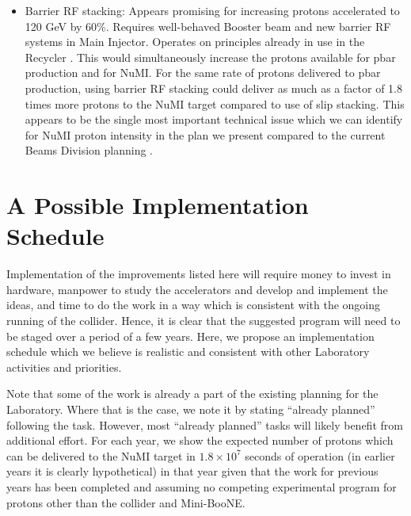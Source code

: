 \documentclass{article}
\begin{document}
\begin {itemize}
         difficulties in multi-batch operation. However, should a single
         batch be slip-stacked for the collider this will reduce the protons
         available to NuMI by about 10\%.
   \item Barrier RF stacking: Appears promising for increasing protons
         accelerated to 120 GeV by 60\%. Requires well-behaved Booster
         beam and new barrier RF systems in Main Injector. Operates on
         principles already in use in the Recycler \cite {Recycler}. This
         would simultaneously increase the protons available for pbar 
         production and for NuMI. For the same rate of protons delivered
         to pbar production, using barrier RF stacking could deliver as
         much as a factor of 1.8 times more protons to the NuMI target
         compared to use of slip stacking.
         This appears to be the single most important technical issue
         which we can identify for NuMI proton intensity in the plan
         we present compared to the current Beams Division planning
         \cite {RunIIB}.
   \end {itemize}

\section {A Possible Implementation Schedule}
\label {sec:timeline}

  Implementation of the improvements listed here will require money to invest
in hardware, manpower to study the accelerators and develop and implement
the ideas,
 and time to do the work in a way which is consistent with the ongoing
running of the collider. Hence, it is clear that the suggested program will
need to be staged over a period of a few years. Here, we propose an
implementation schedule which we believe is realistic and consistent with
other Laboratory activities and priorities. 

Note that some of the work
is already a part of the existing planning for the Laboratory. Where that
is the case, we note it by stating ``already planned'' following the task.
However, most ``already planned'' tasks will likely benefit from additional
effort. For each year, we show the expected number of protons which can be 
delivered
to the NuMI target in $1.8 \times 10^7$ seconds of operation
(in earlier years it is clearly hypothetical) in that 
year given that the work for previous years has been completed and assuming
no competing experimental program for protons other than the collider and
Mini-BooNE.
\end{document}
